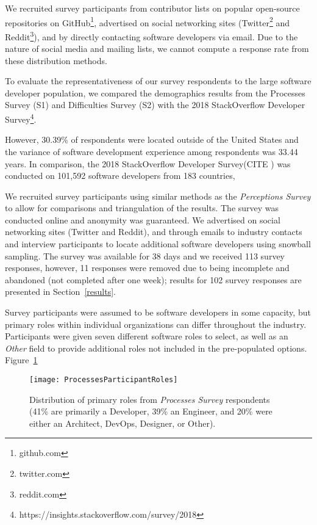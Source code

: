 We recruited survey participants from contributor lists on popular open-source repositories on GitHub\footnote{github.com}, advertised on social networking sites (Twitter\footnote{twitter.com} and Reddit\footnote{reddit.com}), and by directly contacting software developers via email.
Due to the nature of social media and mailing lists, we cannot compute a response rate from these distribution methods.

To evaluate the representativeness of our survey respondents to the large software developer population, we compared the demographics results from the Processes Survey (S1) and Difficulties Survey (S2) with the 2018 StackOverflow Developer Survey\footnote{https://insights.stackoverflow.com/survey/2018}.


However, 30.39\% of respondents were located outside of the United States and the variance of software development experience among respondents was 33.44 years.
In comparison, the 2018 StackOverflow Developer Survey(CITE ) was conducted on 101,592 software developers from 183 countries, 

We recruited survey participants using similar methods as the \textit{Perceptions Survey} to allow for comparisons and triangulation of the results.
The survey was conducted online and anonymity was guaranteed.
We advertised on social networking sites (Twitter and Reddit), and through emails to industry contacts and interview participants to locate additional software developers using snowball sampling.
The survey was available for 38 days and we received 113 survey responses, however, 11 responses were removed due to being incomplete and abandoned (not completed after one week); results for 102 survey responses are presented in Section~\ref{results}.

Survey participants were assumed to be software developers in some capacity, but primary roles within individual organizations can differ throughout the industry.
Participants were given seven different software roles to select, as well as an \textit{Other} field to provide additional roles not included in the pre-populated options.
Figure~\ref{processes_roles}

\begin{figure}[!htbp]
\centering
\texttt{[image: ProcessesParticipantRoles]}
\caption{Distribution of primary roles from \textit{Processes Survey} respondents (41\% are primarily a Developer, 39\% an Engineer, and 20\% were either an Architect, DevOps, Designer, or Other).}
\label{processes_roles}
\end{figure}


